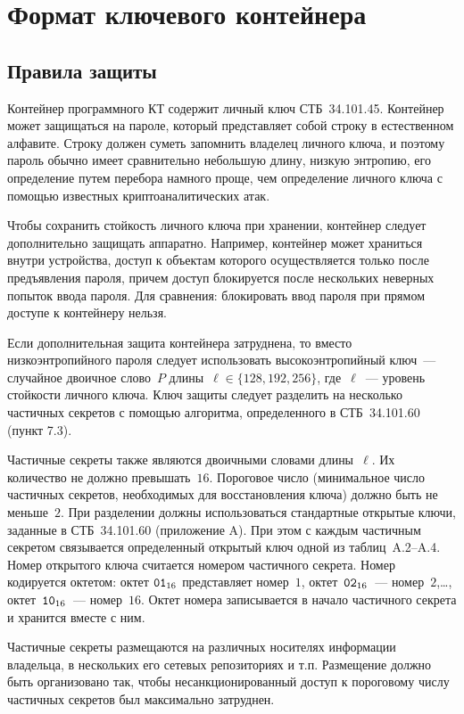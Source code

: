 \chapter{Формат ключевого контейнера}\label{CONT}

\section{Правила защиты}\label{CONT.Rules}

Контейнер программного КТ содержит личный ключ СТБ~34.101.45. Контейнер может
защищаться на пароле, который представляет собой строку в естественном алфавите.
Строку должен суметь запомнить владелец личного ключа, и поэтому пароль обычно
имеет сравнительно небольшую длину, низкую энтропию, его  определение путем
перебора намного проще, чем определение личного ключа с помощью известных
криптоаналитических атак.

Чтобы сохранить стойкость личного ключа при хранении, контейнер следует
дополнительно защищать аппаратно. Например, контейнер может храниться внутри
устройства, доступ к объектам которого осуществляется только после предъявления
пароля, причем доступ блокируется после нескольких неверных попыток ввода
пароля. Для сравнения: блокировать ввод пароля при прямом доступе к контейнеру
нельзя.

Если дополнительная защита контейнера затруднена, то вместо низкоэнтропийного
пароля следует использовать высокоэнтропийный ключ~--- случайное двоичное
слово~$P$ длины~$\ell\in\{128,192,256\}$, где~$\ell$~--- уровень стойкости
личного ключа.
%
Ключ защиты следует разделить на несколько частичных секретов с помощью
алгоритма, определенного в СТБ~34.101.60 (пункт 7.3).

Частичные секреты также являются двоичными словами длины~$\ell$. Их количество
не должно превышать~$16$. Пороговое число (минимальное число частичных секретов,
необходимых для восстановления ключа) должно быть не меньше~$2$.
%
При разделении должны использоваться стандартные открытые ключи, заданные в 
СТБ~34.101.60 (приложение A). При этом с каждым частичным секретом связывается
определенный открытый ключ одной из таблиц~A.2--A.4.
%
Номер открытого ключа считается номером частичного секрета. Номер кодируется
октетом: октет $\texttt{01}_{16}$ представляет номер~$1$, октет~$\texttt{02}_{16}$~---
номер~$2$,\ldots, октет~$\texttt{10}_{16}$~--- номер~$16$. Октет номера записывается в
начало частичного секрета и хранится вместе с ним.

Частичные секреты размещаются на различных носителях информации владельца, в
нескольких его сетевых репозиториях и т.п.
%
Размещение должно быть организовано так, чтобы несанкционированный доступ к
пороговому числу частичных секретов был максимально затруднен.


